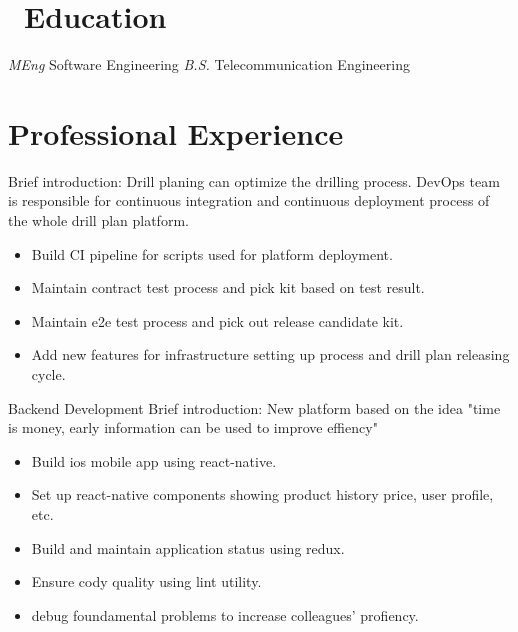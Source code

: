 \documentclass{resume}
\begin{document}



\section{\faGraduationCap\ Education}
\textit{MEng} Software Engineering
\textit{B.S.} Telecommunication Engineering

\section{Professional Experience}

Brief introduction: Drill planing can optimize the drilling process. DevOps team is responsible for continuous integration and continuous deployment process of the whole drill plan platform. 
\begin{itemize}
  \item Build CI pipeline for scripts used for platform deployment.
  \item Maintain contract test process and pick kit based on test result.
  \item Maintain e2e test process and pick out release candidate kit.
  \item Add new features for infrastructure setting up process and drill plan releasing cycle.
\end{itemize}

 {Backend Development}
Brief introduction: New platform based on the idea "time is money, early information can be used to improve effiency" 
\begin{itemize}
  \item Build ios mobile app using react-native. 
  \item Set up react-native components showing product history price, user profile, etc.
  \item Build and maintain application status using redux.
  \item Ensure cody quality using lint utility.
  \item debug foundamental problems to increase colleagues' profiency.
\end{itemize}
\end{document}
